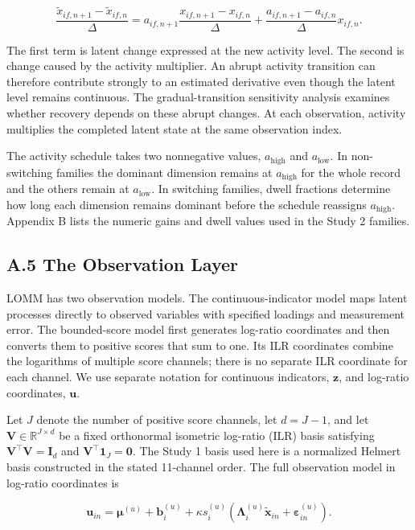 \documentclass[
]{article}
\begin{document}
\[
\frac{\tilde{x}_{if,n+1}-\tilde{x}_{if,n}}{\Delta}
=a_{if,n+1}\frac{x_{if,n+1}-x_{if,n}}{\Delta}
+\frac{a_{if,n+1}-a_{if,n}}{\Delta}x_{if,n}.
\]

The first term is latent change expressed at the new activity level. The
second is change caused by the activity multiplier. An abrupt activity
transition can therefore contribute strongly to an estimated derivative
even though the latent level remains continuous. The gradual-transition
sensitivity analysis examines whether recovery depends on these abrupt
changes. At each observation, activity multiplies the completed latent
state at the same observation index.

The activity schedule takes two nonnegative values,
\(a_{\mathrm{high}}\) and \(a_{\mathrm{low}}\). In non-switching
families the dominant dimension remains at \(a_{\mathrm{high}}\) for the
whole record and the others remain at \(a_{\mathrm{low}}\). In switching
families, dwell fractions determine how long each dimension remains
dominant before the schedule reassigns \(a_{\mathrm{high}}\). Appendix B
lists the numeric gains and dwell values used in the Study 2 families.

\subsection{A.5 The Observation Layer}\label{a.5-the-observation-layer}

LOMM has two observation models. The continuous-indicator model maps
latent processes directly to observed variables with specified loadings
and measurement error. The bounded-score model first generates log-ratio
coordinates and then converts them to positive scores that sum to one.
Its ILR coordinates combine the logarithms of multiple score channels;
there is no separate ILR coordinate for each channel. We use separate
notation for continuous indicators, \(\mathbf z\), and log-ratio
coordinates, \(\mathbf u\).

Let \(J\) denote the number of positive score channels, let \(d=J-1\),
and let \(\mathbf V\in\mathbb R^{J\times d}\) be a fixed orthonormal
isometric log-ratio (ILR) basis satisfying
\(\mathbf V^\top\mathbf V=\mathbf I_d\) and
\(\mathbf V^\top\mathbf 1_J=\mathbf 0\). The Study 1 basis used here is
a normalized Helmert basis constructed in the stated 11-channel order.
The full observation model in log-ratio coordinates is

\[
\mathbf u_{in}
=
\boldsymbol\mu^{(u)}+\mathbf b_i^{(u)}
+\kappa s_i^{(u)}
\left(
\boldsymbol\Lambda_i^{(u)}\tilde{\mathbf x}_{in}
+\boldsymbol\varepsilon_{in}^{(u)}
\right).
\]
\end{document}

